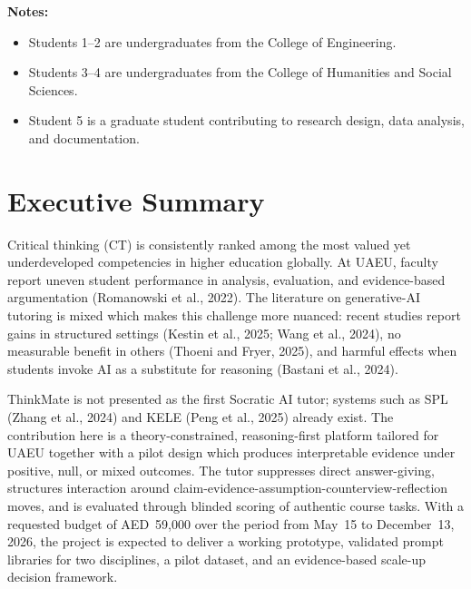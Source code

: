 \documentclass[11pt,a4paper]{article}
\begin{document}
\vspace{0.4cm}
\noindent\textbf{Notes:}
\begin{itemize}[nosep]
    \item Students 1--2 are undergraduates from the College of Engineering.
    \item Students 3--4 are undergraduates from the College of Humanities and Social Sciences.
    \item Student 5 is a graduate student contributing to research design, data analysis, and documentation.
\end{itemize}

\newpage
\tableofcontents
\newpage

\section{Executive Summary}

Critical thinking (CT) is consistently ranked among the most valued yet underdeveloped competencies in higher education globally. At UAEU, faculty report uneven student performance in analysis, evaluation, and evidence-based argumentation (Romanowski et al., 2022). The literature on generative-AI tutoring is mixed which makes this challenge more nuanced: recent studies report gains in structured settings (Kestin et al., 2025; Wang et al., 2024), no measurable benefit in others (Thoeni and Fryer, 2025), and harmful effects when students invoke AI as a substitute for reasoning (Bastani et al., 2024).

ThinkMate is not presented as the first Socratic AI tutor; systems such as SPL (Zhang et al., 2024) and KELE (Peng et al., 2025) already exist. The contribution here is a theory-constrained, reasoning-first platform tailored for UAEU together with a pilot design which produces interpretable evidence under positive, null, or mixed outcomes. The tutor suppresses direct answer-giving, structures interaction around claim-evidence-assumption-counterview-reflection moves, and is evaluated through blinded scoring of authentic course tasks. With a requested budget of AED~59{,}000 over the period from May~15 to December~13, 2026, the project is expected to deliver a working prototype, validated prompt libraries for two disciplines, a pilot dataset, and an evidence-based scale-up decision framework.
\end{document}

